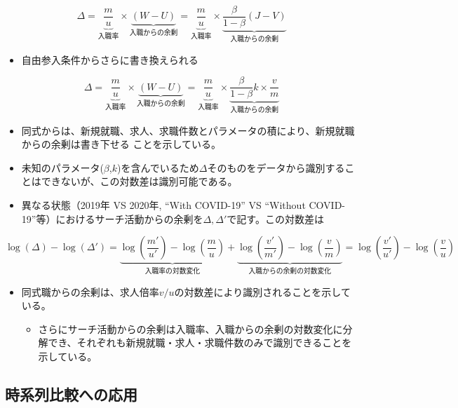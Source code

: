 \documentclass[
]{book}
\providecommand{\tightlist}{%
  \setlength{\itemsep}{0pt}\setlength{\parskip}{0pt}}
\begin{document}
\[\Delta = \underbrace{\frac{m}{u}}_{入職率}\times \underbrace{(W-U)}_{入職からの余剰}=\underbrace{\frac{m}{u}}_{入職率}\times \underbrace{\frac{\beta}{1-\beta}(J-V)}_{入職からの余剰}\]

\begin{itemize}
\tightlist
\item
  自由参入条件からさらに書き換えられる
\end{itemize}

\[\Delta = \underbrace{\frac{m}{u}}_{入職率}\times \underbrace{(W-U)}_{入職からの余剰}=\underbrace{\frac{m}{u}}_{入職率}\times \underbrace{\frac{\beta}{1-\beta}k\times\frac{v}{m}}_{入職からの余剰}\]

\begin{itemize}
\item
  同式からは、新規就職、求人、求職件数とパラメータの積により、新規就職からの余剰は書き下せる
  ことを示している。
\item
  未知のパラメータ(\(\beta\),\(k\))を含んでいるため\(\Delta\)そのものをデータから識別することはできないが、この対数差は識別可能である。
\item
  異なる状態（2019年 VS 2020年, ``With COVID-19'' VS ``Without COVID-19''等）におけるサーチ活動からの余剰を\(\Delta,\Delta'\)で記す。この対数差は
\end{itemize}

\[\log (\Delta) - \log(\Delta')=\underbrace{\log(\frac{m'}{u'})-\log(\frac{m}{u})}_{入職率の対数変化} + \underbrace{\log(\frac{v'}{m'})-\log(\frac{v}{m})}_{入職からの余剰の対数変化} = \log(\frac{v'}{u'})-\log(\frac{v}{u})\]

\begin{itemize}
\item
  同式職からの余剰は、求人倍率\(v/u\)の対数差により識別されることを示している。

  \begin{itemize}
  \tightlist
  \item
    さらにサーチ活動からの余剰は入職率、入職からの余剰の対数変化に分解でき、それぞれも新規就職・求人・求職件数のみで識別できることを示している。
  \end{itemize}
\end{itemize}

\hypertarget{ux6642ux7cfbux5217ux6bd4ux8f03ux3078ux306eux5fdcux7528}{%
\subsection{時系列比較への応用}\label{ux6642ux7cfbux5217ux6bd4ux8f03ux3078ux306eux5fdcux7528}}
\end{document}
